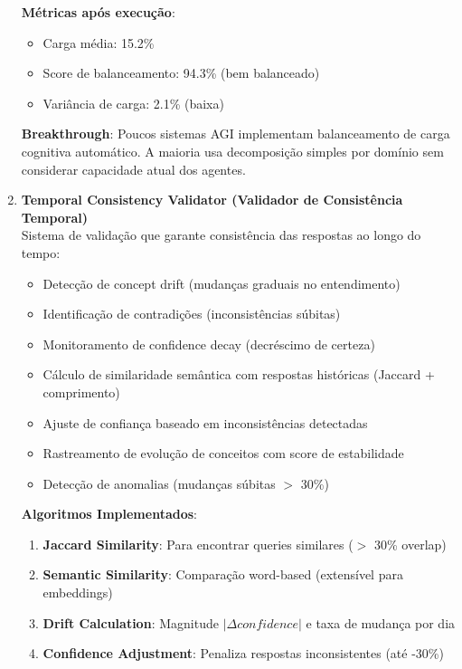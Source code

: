 \documentclass[11pt]{article}
\begin{document}
\begin{enumerate}
\textbf{Métricas após execução}:
\begin{itemize}
    \item Carga média: 15.2\%
    \item Score de balanceamento: 94.3\% (bem balanceado)
    \item Variância de carga: 2.1\% (baixa)
\end{itemize}

\textbf{Breakthrough}: Poucos sistemas AGI implementam balanceamento de carga cognitiva automático. A maioria usa decomposição simples por domínio sem considerar capacidade atual dos agentes.

    \item \textbf{Temporal Consistency Validator (Validador de Consistência Temporal)} \\
    Sistema de validação que garante consistência das respostas ao longo do tempo:
    \begin{itemize}
        \item Detecção de concept drift (mudanças graduais no entendimento)
        \item Identificação de contradições (inconsistências súbitas)
        \item Monitoramento de confidence decay (decréscimo de certeza)
        \item Cálculo de similaridade semântica com respostas históricas (Jaccard + comprimento)
        \item Ajuste de confiança baseado em inconsistências detectadas
        \item Rastreamento de evolução de conceitos com score de estabilidade
        \item Detecção de anomalias (mudanças súbitas $>$ 30\%)
    \end{itemize}

\textbf{Algoritmos Implementados}:
\begin{enumerate}
    \item \textbf{Jaccard Similarity}: Para encontrar queries similares ($>$ 30\% overlap)
    \item \textbf{Semantic Similarity}: Comparação word-based (extensível para embeddings)
    \item \textbf{Drift Calculation}: Magnitude $|\Delta confidence|$ e taxa de mudança por dia
    \item \textbf{Confidence Adjustment}: Penaliza respostas inconsistentes (até -30\%)
\end{enumerate}


\end{enumerate}
\end{document}
